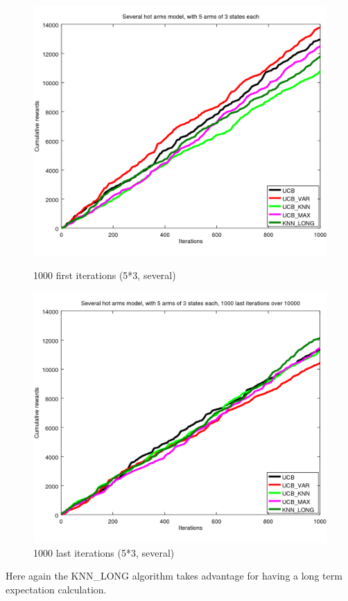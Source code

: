 \documentclass[french]{beamer}
\begin{document}
\begin{frame}
	\begin{figure}[h]
		\begin{minipage}[b]{.49\linewidth}
			\includegraphics[width=1.0\textwidth]{begin_ms_1000it.png}
			\caption{1000 first iterations (5*3, several)}
		\end{minipage}
		\hfill
		\begin{minipage}[b]{0.49\linewidth}
			\includegraphics[width=1.0\textwidth]{last_ms_1000it.png}
			\caption{1000 last iterations (5*3, several)}
		\end{minipage}
		\label{fig:f}
	\end{figure}
	
	Here again the KNN\_LONG algorithm takes advantage for having a long term expectation calculation.
	
	\clearpage
\end{frame}
\end{document}
